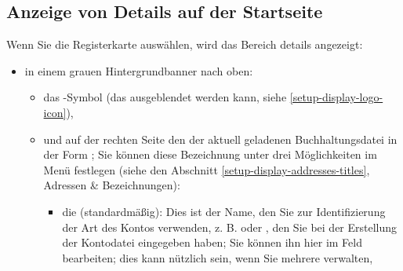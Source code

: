 \subsection{Anzeige von Details auf der Startseite\label{home-details-homepage}}

Wenn Sie die Registerkarte  auswählen, wird das Bereich details angezeigt:%

\begin{itemize}
	\item in einem grauen Hintergrundbanner nach oben:%
		\begin{itemize}
			\item das -Symbol (das ausgeblendet werden kann, siehe \vref{setup-display-logo-icon}),
			\item und auf der rechten Seite den  der aktuell geladenen Buchhaltungsdatei in der Form ; Sie können diese Bezeichnung unter drei Möglichkeiten im Menü  festlegen (siehe den Abschnitt \vref{setup-display-addresses-titles}, Adressen \& Bezeichnungen):%
				\begin{itemize}
			 		\item die  (standardmäßig): Dies ist der Name, den Sie zur Identifizierung der Art des Kontos verwenden, z. B.  oder , den Sie bei der Erstellung der Kontodatei eingegeben haben; Sie können ihn hier im Feld  bearbeiten; dies kann nützlich sein, wenn Sie mehrere  verwalten,%

\end{itemize}
\end{itemize}
\end{itemize}
